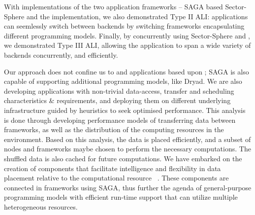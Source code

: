 \documentclass[3p,twocolumn]{elsarticle}
\begin{document}
With implementations of the two application frameworks -- SAGA based
Sector-Sphere and the \smr implementation, we also demonstrated Type
II ALI: applications can seemlessly switch between backends by
switching frameworks encapsulating different programming models.
Finally, by concurrently using Sector-Sphere \mr and \smr, we
demonstrated Type III ALI, allowing the application to span a wide
variety of backends concurrently, and efficiently.

Our approach does not confine us to \mr and applications based upon
\mr; SAGA is also capable of supporting additional programming models,
like Dryad.  We are also developing applications with non-trivial
data-access, transfer and scheduling characteristics \& requirements,
and deploying them on different underlying infrastructure guided by
heuristics to seek optimised performance.
This analysis is done through developing performance models of
transferring data between frameworks, as well as the distribution of
the computing resources in the environment. Based on this analysis,
the data is placed efficiently, and a subset of nodes and frameworks
maybe chosen to perform the necessary computations. The shuffled data
is also cached for future computations.  We have embarked on the
creation of components that facilitate intelligence and flexibility in
data placement relative to the computational resource
~\cite{saga_dic_royalsoc09}. These components are connected in
frameworks using SAGA, thus further the agenda of general-purpose
programming models with efficient run-time support that can utilize
multiple heterogeneous resources.



\end{document}
